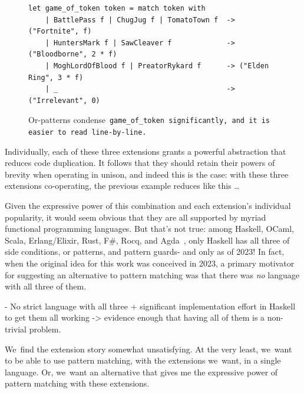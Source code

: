\documentclass[article,screen,12pt, nonacm]{acmart}
\begin{document}
          \begin{figure}
    \begin{center}
    \begin{verbatim}
let game_of_token token = match token with 
    | BattlePass f | ChugJug f | TomatoTown f  -> ("Fortnite", f)
    | HuntersMark f | SawCleaver f             -> ("Bloodborne", 2 * f)
    | MoghLordOfBlood f | PreatorRykard f      -> ("Elden Ring", 3 * f)
    | _                                        -> ("Irrelevant", 0)
    \end{verbatim}
    \end{center}    
    \caption{Or-patterns condense~\tt{game\_of\_token}
    significantly, and it is easier to read line-by-line.} 
    \label{fig:orgot}
    \end{figure}

    \newpage
    Individually, each of these three extensions grants a powerful abstraction
    that reduces code duplication. It follows that they should retain their
    powers of brevity when operating in unison, and indeed this is the case:
    with these three extensions co-operating, the previous example reduces like
    this \dots

    Given the expressive power of this combination and each extension's
    individual popularity, it would seem obvious that they are all supported by
    myriad functional programming languages. But that's not true: among Haskell,
    OCaml, Scala, Erlang/Elixir, Rust, F\#, Rocq, and Agda~\citep{haskell,
    ocaml, scala, erlang, elixir, rust, fsharp, agda}, only Haskell has all
    three of side conditions, or patterns, and pattern guards- and only as of
    2023! In fact, when the original idea for this work was conceived in 2023, a
    primary motivator for suggesting an alternative to pattern matching was that
    there was \textit{no} language with all three of them. 

    - No strict language with all three + significant implementation effort in
    Haskell to get them all working -> evidence enough that having all of them
    is a non-trivial problem. 
    
    We~find the extension story somewhat unsatisfying. At the very least,
    we~want to be able to use pattern matching, with the extensions we~want, in
    a single language. Or, we~want an alternative that gives me the expressive
    power of pattern matching with these extensions. 
\end{document}
